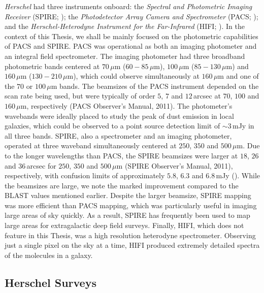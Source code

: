 \textit{Herschel} had three instruments onboard: the \textit{Spectral and Photometric Imaging Receiver} (SPIRE; \citealt{Griffin_2010}); the \textit{Photodetector Array Camera and Spectrometer} (PACS; \citealt{Poglitsch_2010}); and the \textit{Herschel-Heterodyne Instrument for the Far-Infrared} (HIFI; \citealt{deGraauw_2010}). In the context of this Thesis, we shall be mainly focused on the photometric capabilities of PACS and SPIRE. PACS was operational as both an imaging photometer and an integral field spectrometer. The imaging photometer had three broadband photometric bands centered at $70\,\mu$m ($60 - 85\,\mu$m), $100\,\mu$m ($85 - 130\,\mu$m) and $160\,\mu$m ($130 - 210\,\mu$m), which could observe simultaneously at $160\,\mu$m and one of the $70$ or $100\,\mu$m bands. The beamsizes of the PACS instrument depended on the scan rate being used, but were typically of order $5$, $7$ and $12\,$arcsec at $70$, $100$ and $160\,\mu$m, respectively ({\color{red}PACS Observer's Manual, 2011}). The photometer's wavebands were ideally placed to study the peak of dust emission in local galaxies, which could be observed to a point source detection limit of $\sim 3\,$mJy in all three bands. SPIRE, also a spectrometer and an imaging photometer, operated at three waveband simultaneously centered at $250$, $350$ and $500\,\mu$m. Due to the longer wavelengths than PACS, the SPIRE beamsizes were larger at $18$, $26$ and $36\,$arcsec for $250$, $350$ and $500\,\mu$m ({\color{red}SPIRE Observer's Manual, 2011}), respectively, with confusion limits of approximately $5.8$, $6.3$ and $6.8\,$mJy (\citealt{Casey_2014b}). While the beamsizes are large, we note the marked improvement compared to the BLAST values mentioned earlier. Despite the larger beamsize, SPIRE mapping was more efficient than PACS mapping, which was particularly useful in imaging large areas of sky quickly. As a result, SPIRE has frequently been used to map large areas for extragalactic deep field surveys. Finally, HIFI, which does not feature in this Thesis, was a high resolution heterodyne spectrometer. Observing just a single pixel on the sky at a time, HIFI produced extremely detailed spectra of the molecules in a galaxy.

\subsection{Herschel Surveys}

